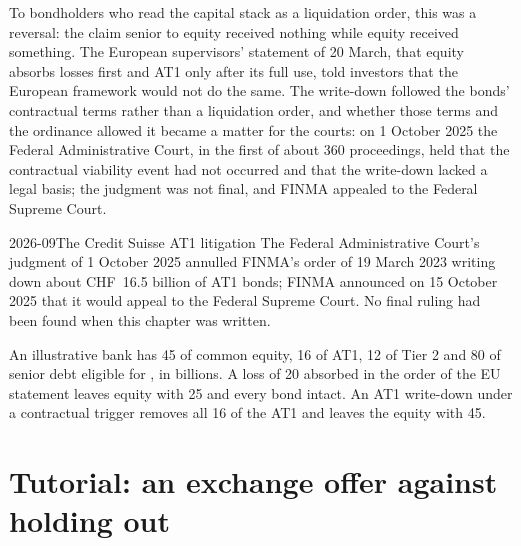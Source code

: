 To bondholders who read the capital stack as a liquidation order, this was a reversal:
the claim senior to equity received nothing while equity received something. The
European supervisors' statement of 20 March, that equity absorbs losses first and AT1
only after its full use, told investors that the European framework would not do the
same. The write-down followed the bonds' contractual terms rather than a liquidation
order, and whether those terms and the ordinance allowed it became a matter for the
courts: on 1 October 2025 the Federal Administrative Court, in the first of about 360
proceedings, held that the contractual viability event had not occurred and that the
write-down lacked a legal basis; the judgment was not final, and FINMA appealed to the
Federal Supreme Court.

\begin{dated}{2026-09}{The Credit Suisse AT1 litigation}\label{dat:m2:distressed-sovereign-and-bank-capital-credit:at1}
The Federal Administrative Court's judgment of 1 October 2025 annulled FINMA's order of
19 March 2023 writing down about CHF~16.5 billion of AT1 bonds; FINMA announced on 15
October 2025 that it would appeal to the Federal Supreme Court. No final ruling had been
found when this chapter was written.
\end{dated}

\begin{example}\label{ex:m2:distressed-sovereign-and-bank-capital-credit:stack}
An illustrative bank has 45 of common equity, 16 of AT1, 12 of Tier 2 and 80 of senior
debt eligible for , in billions. A loss of 20 absorbed in the order of the EU
statement leaves equity with 25 and every bond intact. An AT1 write-down under a
contractual trigger removes all 16 of the AT1 and leaves the equity with 45.
\end{example}

\section{Tutorial: an exchange offer against holding out}\label{tut:m2:distressed-sovereign-and-bank-capital-credit:recovery}

